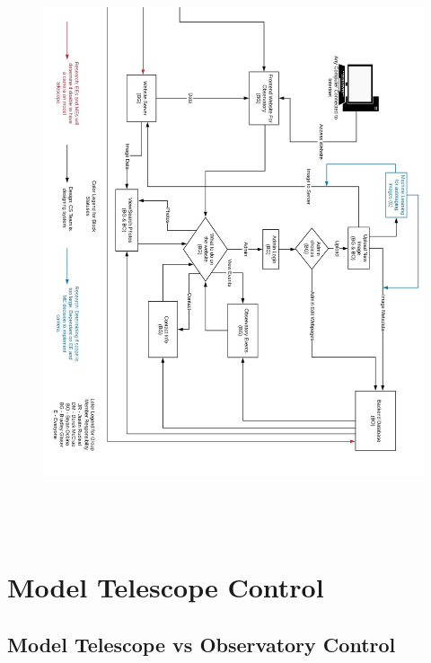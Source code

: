 \documentclass[12pt]{article}
\begin{document}
\begin{figure}[h]
	\centering
	\includegraphics[width=1.00\linewidth, height=17.0cm]{blockpt1}
\end{figure}

\newpage

\section{Model Telescope Control}

\subsection{Model Telescope vs Observatory Control}
\end{document}
